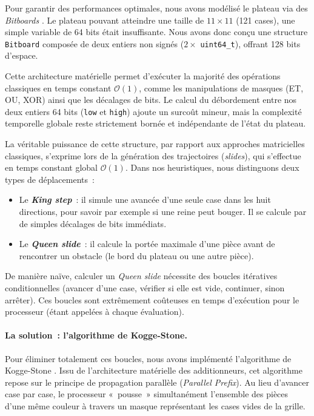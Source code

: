 \documentclass[a4paper]{article}
\begin{document}
Pour garantir des performances optimales, nous avons modélisé le plateau
via des \textit{Bitboards} \cite{Browne2014}. Le plateau pouvant atteindre une taille de
$11 \times 11$ (121 cases), une simple variable de 64 bits était insuffisante.
Nous avons donc conçu une structure \texttt{Bitboard} composée de deux
entiers non signés ($2 \times$ \texttt{uint64\_t}), offrant 128 bits
d'espace. 

Cette architecture matérielle permet d'exécuter la majorité des opérations classiques
en temps constant $\mathcal{O}(1)$, comme les manipulations de masques (ET, OU, XOR) 
ainsi que les décalages de bits. Le calcul du 
débordement entre nos deux entiers 64 bits (\texttt{low} et \texttt{high}) ajoute un surcoût 
mineur, mais la complexité temporelle globale reste strictement bornée et indépendante de l'état du plateau.

La véritable puissance de cette structure, par rapport aux approches matricielles classiques,
s'exprime lors de la génération des trajectoires (\textit{slides}), qui s'effectue en temps constant
global $\mathcal{O}(1)$. Dans nos heuristiques, nous distinguons deux types de déplacements~:

\begin{itemize}
    \item Le \textbf{\textit{King step}}~: il simule une avancée d'une seule case dans les huit directions, pour savoir par exemple si une reine peut bouger. Il se calcule par de simples décalages de bits immédiats.
    \item Le \textbf{\textit{Queen slide}}~: il calcule la portée maximale d'une pièce avant de rencontrer un obstacle (le bord du plateau ou une autre pièce).
\end{itemize}

De manière naïve, calculer un \textit{Queen slide} nécessite des boucles itératives
conditionnelles (avancer d'une case, vérifier si elle est vide, continuer, sinon arrêter). Ces
boucles sont extrêmement coûteuses en temps d'exécution pour le processeur (étant appelées à chaque évaluation).

\paragraph{La solution~: l'algorithme de Kogge-Stone.}
Pour éliminer totalement ces boucles, nous avons implémenté l'algorithme de Kogge-Stone \cite{CPW_KoggeStone}.
Issu de l'architecture matérielle des additionneurs, cet algorithme repose sur le principe de propagation
parallèle (\textit{Parallel Prefix}). Au lieu d'avancer case par case, le processeur «~pousse~»
simultanément l'ensemble des pièces d'une même couleur à travers un masque représentant
les cases vides de la grille.
\end{document}
